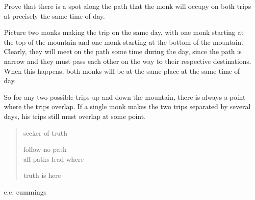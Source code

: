 \documentclass[fleqn,addpoints]{exam}
\begin{document}
\begin{questions}
Prove that there is a spot along the path that the monk will occupy on both trips at precisely the same time of day.

\begin{solution}

Picture two monks making the trip on the same day, with one monk starting at the top of the mountain and one monk
starting at the bottom of the mountain.  Clearly, they will meet on the path some time during the day, since the path is
narrow and they must pass each other on the way to their respective destinations.  When this happens,
both monks will be at the same place at the same time of day.  

So for any two possible trips up and down the mountain, there is always a point where the trips overlap.  If a single
monk makes the two trips separated by several days, his trips still must overlap at some point.

\end{solution}

\end{questions}

\ifprintanswers
\else
\vspace{5 in}

\begin{verse}
seeker of truth

follow no path \\
all paths lead where

truth is here 
\end{verse}
\hspace{1 in} e.e. cummings

\fi
\end{document}
